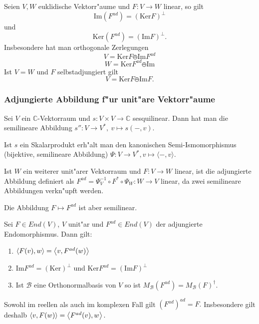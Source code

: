 \documentclass[8pt, a4paper, twocolumn, landscape]{article}
\begin{document}
\begin{theorem}
Seien $V, W$ euklidische Vektorr"aume und $F : V \rightarrow W$ linear, so gilt
$$
\mathrm{Im}(F^{ad}) = (\mathrm{Ker}F)^\perp
$$
und
 $$
\mathrm{Ker}(F^{ad}) = (\mathrm{Im}F)^\perp.
$$
Insbesondere hat man orthogonale Zerlegungen
$$
V = \mathrm{Ker} F \obot \mathrm{Im}F^{ad}
$$
$$
W = \mathrm{Ker}F^{ad} \obot \mathrm{Im}
$$
Ist $V = W$ und $F$ selbstadjungiert gilt
$$
V = \mathrm{Ker}F \obot \mathrm{Im}F.
$$

\end{theorem}

\subsubsection{Adjungierte Abbildung f"ur unit"are Vektorr"aume}
\begin{definition}
Sei $V$ ein $\mathbb{C}$-Vektorraum und $s : V \times V \rightarrow \mathbb{C}$ sesquilinear.
Dann hat man die semilineare Abbildung 
$
s'' : V \rightarrow V^*, \ v \mapsto s(-, v).
$

Ist $s$ ein Skalarprodukt erh"alt man den kanonischen Semi-Ismomorphismus (bijektive, semilineare Abbildung)
$
\Psi : V \rightarrow V^*, v \mapsto \langle - , v \rangle.
$

Ist $W$ ein weiterer unit"arer Vektorraum und $F : V \rightarrow W$ linear, ist die adjungierte Abbildung definiert als 
$
F^{ad} = \Psi^{-1}_V \circ F^* \circ \Psi_W  : W \rightarrow V
$
linear, da zwei semilineare Abbildungen verkn"upft werden.

Die Abbildung $ F \mapsto F^{ad}$ ist aber semilinear.
\end{definition}

\begin{theorem}
Sei $F \in End(V)$, $V$  unit"ar und $F^{ad} \in End(V)$ der adjungierte Endomorphismus. Dann gilt:
\begin{enumerate}
\item $\left\langle {F(v)} , {w} \right\rangle = \left\langle {v} , {F^{ad}(w)} \right\rangle$
\item $\mathrm{Im}F^{ad} = (\mathrm{Ker})^\perp$ und $\mathrm{Ker}F^{ad} = (\mathrm{Im}F)^\perp$
\item Ist $\mathcal{B}$ eine Orthonormalbasis von $V$ so ist
$
M_{\mathcal{B}}(F^{ad}) = M_\mathcal{B}(F)^\dagger.
$
\end{enumerate}
\end{theorem}

\begin{remark}
Sowohl im reellen als auch im komplexen Fall gilt 
$
(F^{ad})^{ad} = F.
$
Insbesondere gilt deshalb $\left\langle {v} , {F(w)} \right\rangle = \left\langle {F^{ad}(v)} , {w} \right\rangle.$
\end{remark}
\end{document}
